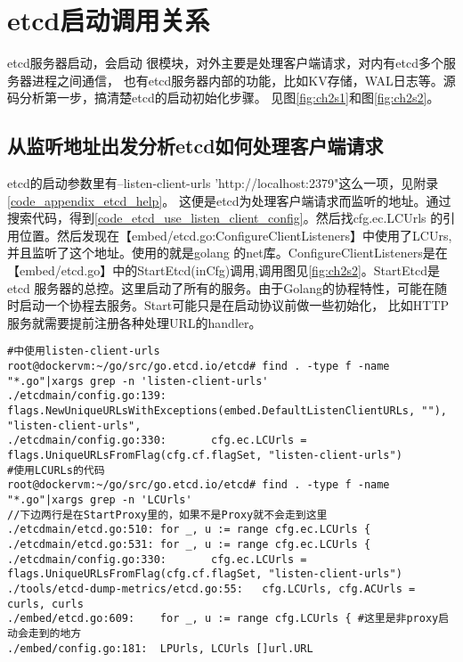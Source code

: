 \section{etcd启动调用关系}
etcd服务器启动，会启动 很模块，对外主要是处理客户端请求，对内有etcd多个服务器进程之间通信，
也有etcd服务器内部的功能，比如KV存储，WAL日志等。源码分析第一步，搞清楚etcd的启动初始化步骤。
见图\ref{fig:ch2s1}和图\ref{fig:ch2s2}。
\subsection{从监听地址出发分析etcd如何处理客户端请求}
etcd的启动参数里有--listen-client-urls 'http://localhost:2379"这么一项，见附录\ref{code_appendix_etcd_help}。
这便是etcd为处理客户端请求而监听的地址。通过搜索代码，得到\ref{code_etcd_use_listen_client_config}。然后找cfg.ec.LCUrls
的引用位置。然后发现在【embed/etcd.go:ConfigureClientListeners】中使用了LCUrs,并且监听了这个地址。使用的就是golang
的net库。ConfigureClientListeners是在【embed/etcd.go】中的StartEtcd(inCfg)调用,调用图见\ref{fig:ch2s2}。StartEtcd是etcd
服务器的总控。这里启动了所有的服务。由于Golang的协程特性，可能在随时启动一个协程去服务。Start可能只是在启动协议前做一些初始化，
比如HTTP服务就需要提前注册各种处理URL的handler。
\label{code_etcd_use_listen_client_config}
\begin{verbatim}
#中使用listen-client-urls
root@dockervm:~/go/src/go.etcd.io/etcd# find . -type f -name "*.go"|xargs grep -n 'listen-client-urls'
./etcdmain/config.go:139:               flags.NewUniqueURLsWithExceptions(embed.DefaultListenClientURLs, ""), "listen-client-urls",
./etcdmain/config.go:330:       cfg.ec.LCUrls = flags.UniqueURLsFromFlag(cfg.cf.flagSet, "listen-client-urls")
#使用LCURLs的代码
root@dockervm:~/go/src/go.etcd.io/etcd# find . -type f -name "*.go"|xargs grep -n 'LCUrls'
//下边两行是在StartProxy里的，如果不是Proxy就不会走到这里
./etcdmain/etcd.go:510: for _, u := range cfg.ec.LCUrls {
./etcdmain/etcd.go:531: for _, u := range cfg.ec.LCUrls {
./etcdmain/config.go:330:       cfg.ec.LCUrls = flags.UniqueURLsFromFlag(cfg.cf.flagSet, "listen-client-urls")
./tools/etcd-dump-metrics/etcd.go:55:   cfg.LCUrls, cfg.ACUrls = curls, curls
./embed/etcd.go:609:    for _, u := range cfg.LCUrls { #这里是非proxy启动会走到的地方
./embed/config.go:181:  LPUrls, LCUrls []url.URL


\end{verbatim}

